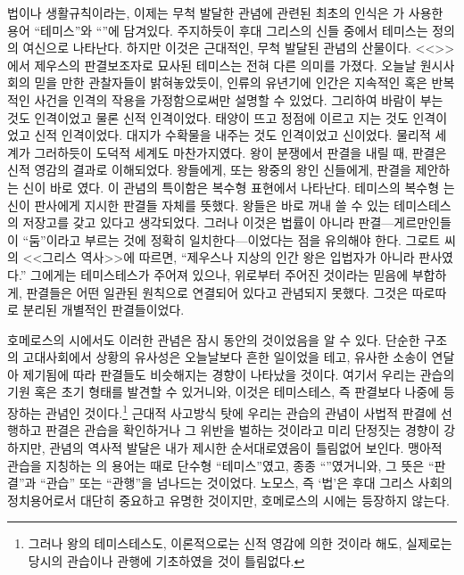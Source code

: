 법이나 생활규칙이라는, 이제는 무척 발달한 관념에 관련된 최초의 인식은
가 사용한 용어 ``테미스''와
``''에 담겨있다.
주지하듯이 후대 그리스의 신들 중에서 테미스는 정의의 여신으로 나타난다.
하지만 이것은 근대적인, 무척 발달된 관념의 산물이다.
<<>>에서 제우스의 판결보조자로 묘사된 테미스는 전혀 다른 의미를 가졌다.
오늘날 원시사회의 믿을 만한 관찰자들이 밝혀놓았듯이,
인류의 유년기에 인간은
지속적인 혹은 반복적인 사건을
인격의 작용을 가정함으로써만
설명할 수 있었다.
그리하여 바람이 부는 것도 인격이었고 물론 신적 인격이었다.
태양이 뜨고 정점에 이르고 지는 것도 인격이었고 신적 인격이었다.
대지가 수확물을 내주는 것도 인격이었고 신이었다.
물리적 세계가 그러하듯이 도덕적 세계도 마찬가지였다.
왕이 분쟁에서 판결을 내릴 때, 판결은 신적 영감의 결과로 이해되었다.
왕들에게, 또는 왕중의 왕인 신들에게, 판결을 제안하는 신이
바로 였다.
이 관념의 특이함은 복수형 표현에서 나타난다.
테미스의 복수형 는 신이 판사에게 지시한
판결들 자체를 뜻했다.
왕들은 바로 꺼내 쓸 수 있는 테미스테스의 저장고를 갖고 있다고 생각되었다.
그러나 이것은 법률이 아니라
판결---게르만인들이 ``둠''이라고 부르는 것에 정확히 일치한다---이었다는
점을 유의해야 한다.
그로트 씨의 <<그리스 역사>>에 따르면,
``제우스나 지상의 인간 왕은 입법자가 아니라 판사였다.''
그에게는 테미스테스가 주어져 있으나,
위로부터 주어진 것이라는 믿음에 부합하게,
판결들은 어떤 일관된 원칙으로 연결되어 있다고 관념되지 못했다.
그것은 따로따로 분리된 개별적인 판결들이었다.

호메로스의 시에서도 이러한 관념은 잠시 동안의 것이었음을 알 수 있다.
단순한 구조의 고대사회에서 상황의 유사성은 오늘날보다 흔한 일이었을 테고,
유사한 소송이 연달아 제기됨에 따라 판결들도 비슷해지는 경향이 나타났을 것이다.
여기서 우리는 관습의 기원 혹은 초기 형태를 발견할 수 있거니와,
이것은 테미스테스, 즉 판결보다 나중에 등장하는 관념인 것이다.\footnote{%
  그러나 왕의 테미스테스도, 이론적으로는 신적 영감에 의한 것이라 해도,
  실제로는 당시의 관습이나 관행에 기초하였을 것이 틀림없다.
   }
근대적 사고방식 탓에 우리는 관습의 관념이 사법적 판결에 선행하고
판결은 관습을 확인하거나 그 위반을 벌하는 것이라고 미리 단정짓는
경향이 강하지만, 관념의 역사적 발달은 내가 제시한 순서대로였음이
틀림없어 보인다.
맹아적 관습을 지칭하는 의 용어는 때로 단수형 ``테미스''였고,
종종 ``''였거니와, 그 뜻은 ``판결''과 ``관습'' 또는
``관행''을 넘나드는 것이었다.
노모스, 즉 `법'은 후대 그리스 사회의 정치용어로서 대단히 중요하고
유명한 것이지만, 호메로스의 시에는 등장하지 않는다.

